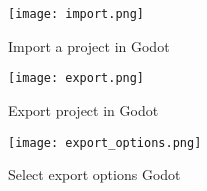 \documentclass{sigplanconf}
\begin{document}
\begin{figure}[h]
  \caption{Import a project in Godot}
  \texttt{[image: import.png]}
\end{figure}

\begin{figure}[h]
  \caption{Export project in Godot}
  \texttt{[image: export.png]}
\end{figure}

\begin{figure}[h]
  \caption{Select export options Godot}
  \texttt{[image: export\_options.png]}
\end{figure}

\end{document}
